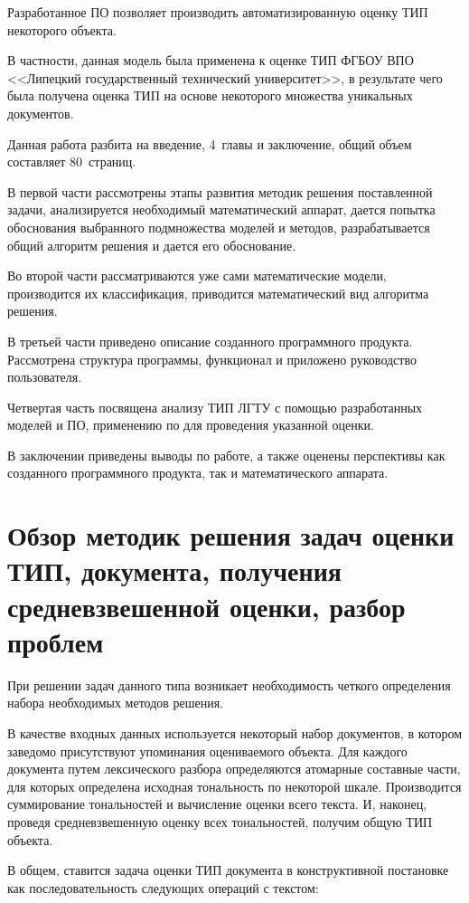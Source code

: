\documentclass[a4paper,14pt,russian]{extreport}
\begin{document}
Разработанное ПО позволяет производить автоматизированную оценку \mbox{ТИП} некоторого объекта.

В частности, данная модель была применена к оценке \mbox{ТИП} \mbox{ФГБОУ} \mbox{ВПО} <<Липецкий государственный технический университет>>, в результате чего была получена оценка \mbox{ТИП} на основе некоторого множества уникальных документов.

Данная работа разбита на введение, 4~главы и заключение, общий объем составляет 80~страниц.

В первой части рассмотрены этапы развития методик решения поставленной задачи, анализируется необходимый математический аппарат, дается попытка обоснования выбранного подмножества моделей и методов, разрабатывается общий алгоритм решения и дается его обоснование.

Во второй части рассматриваются уже сами математические модели, производится их классификация, приводится математический вид алгоритма решения.

В третьей части приведено описание созданного программного продукта. Рассмотрена структура программы, функционал и приложено руководство пользователя.

Четвертая часть посвящена анализу \mbox{ТИП} \mbox{ЛГТУ} с помощью разработанных моделей и \mbox{ПО}, применению по для проведения указанной оценки.

В заключении приведены выводы по работе, а также оценены перспективы как созданного программного продукта, так и математического аппарата.
\newpage

\chapter{Обзор методик решения задач оценки ТИП, документа, получения средневзвешенной оценки, разбор проблем}

При решении задач данного типа возникает необходимость четкого определения набора необходимых методов решения.

В качестве входных данных используется некоторый набор документов, в котором заведомо присутствуют упоминания оцениваемого объекта. Для каждого документа путем лексического разбора определяются атомарные составные части, для которых определена исходная тональность по некоторой шкале. Производится суммирование тональностей и вычисление оценки всего текста. И, наконец, проведя средневзвешенную оценку всех тональностей, получим общую \mbox{ТИП} объекта.

В общем, ставится задача оценки \mbox{ТИП} документа в конструктивной постановке как последовательность следующих операций с текстом:
\end{document}
